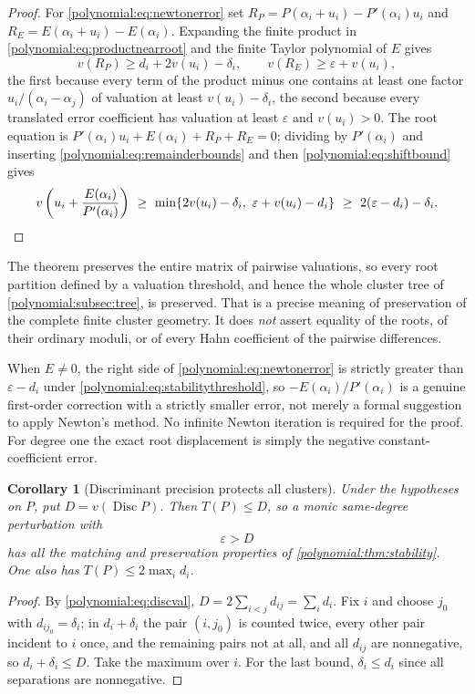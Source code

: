 \documentclass[11pt,letterpaper]{article}
\numberwithin{equation}{section}
\newtheorem{corollary}[theorem]{Corollary}
\theoremstyle{definition}
\theoremstyle{remark}\newtheorem{remark}[theorem]{Remark}
\newcommand{\Disc}{\operatorname{Disc}}
\begin{document}
\begin{proof}
For \eqref{polynomial:eq:newtonerror} set
$R_P=P(\alpha_i+u_i)-P'(\alpha_i)u_i$ and $R_E=E(\alpha_i+u_i)-E(\alpha_i)$.
Expanding the finite product in \eqref{polynomial:eq:productnearroot} and the
finite Taylor polynomial of $E$ gives
\begin{equation}\label{polynomial:eq:remainderbounds}
 v(R_P)\ge d_i+2v(u_i)-\delta_i,\qquad v(R_E)\ge\varepsilon+v(u_i),
\end{equation}
the first because every term of the product minus one contains at least one
factor $u_i/(\alpha_i-\alpha_j)$ of valuation at least $v(u_i)-\delta_i$, the
second because every translated error coefficient has valuation at least
$\varepsilon$ and $v(u_i)>0$. The root equation is
$P'(\alpha_i)u_i+E(\alpha_i)+R_P+R_E=0$; dividing by $P'(\alpha_i)$ and
inserting \eqref{polynomial:eq:remainderbounds} and then
\eqref{polynomial:eq:shiftbound} gives
\[
 v\left(u_i+\frac{E(\alpha_i)}{P'(\alpha_i)}\right)
 \ \ge\ \min\{2v(u_i)-\delta_i,\ \varepsilon+v(u_i)-d_i\}
 \ \ge\ 2(\varepsilon-d_i)-\delta_i . \qedhere
\]
\end{proof}

The theorem preserves the entire matrix of pairwise valuations, so every root
partition defined by a valuation threshold, and hence the whole cluster tree
of \cref{polynomial:subsec:tree}, is preserved. That is a precise meaning of
preservation of the complete finite cluster geometry. It does \emph{not}
assert equality of the roots, of their ordinary moduli, or of every Hahn
coefficient of the pairwise differences.

When $E\ne0$, the right side of \eqref{polynomial:eq:newtonerror} is strictly greater than
$\varepsilon-d_i$ under \eqref{polynomial:eq:stabilitythreshold}, so
$-E(\alpha_i)/P'(\alpha_i)$ is a genuine first-order correction with a
strictly smaller error, not merely a formal suggestion to apply Newton's
method. No infinite Newton iteration is required for the proof. For degree one
the exact root displacement is simply the negative constant-coefficient error.

\begin{corollary}[Discriminant precision protects all clusters]
\label{polynomial:cor:discprecision}
Under the hypotheses on $P$, put $D=v(\Disc P)$. Then $T(P)\le D$, so a monic
same-degree perturbation with
\begin{equation}\label{polynomial:eq:discriminantprecision}
 \varepsilon>D
\end{equation}
has all the matching and preservation properties of
\cref{polynomial:thm:stability}. One also has $T(P)\le2\max_id_i$.
\end{corollary}
\begin{proof}
By \eqref{polynomial:eq:discval}, $D=2\sum_{i<j}d_{ij}=\sum_i d_i$. Fix $i$
and choose $j_0$ with $d_{ij_0}=\delta_i$; in $d_i+\delta_i$ the pair
$(i,j_0)$ is counted twice, every other pair incident to $i$ once, and the
remaining pairs not at all, and all $d_{ij}$ are nonnegative, so
$d_i+\delta_i\le D$. Take the maximum over $i$. For the last bound,
$\delta_i\le d_i$ since all separations are nonnegative.
\end{proof}
\end{document}
